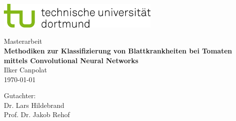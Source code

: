 \begin{titlepage}
\vspace*{-2cm}
\newlength{\links}
\setlength{\links}{-1.5cm}
\sffamily
\hspace*{\links}
\begin{minipage}{12.5cm}
\includegraphics[width=8cm]{bilder/tud_logo_rgb}
\end{minipage}

\vspace*{4cm}

\hspace*{\links}
\hspace*{-0.2cm}
\begin{minipage}{9cm}
\large
\begin{center}
{\Large Masterarbeit} \\
\vspace*{1cm}
\textbf{Methodiken zur Klassifizierung von Blattkrankheiten bei Tomaten mittels Convolutional Neural Networks} \\
\vspace*{1cm}
Ilker Canpolat\\
\today
\end{center}
\end{minipage}
\normalsize
\vspace*{5.5cm}


\vspace*{2.1cm}

\hspace*{\links}
\begin{minipage}[b]{5cm}
\raggedright
Gutachter: \\
Dr. Lars Hildebrand \\
Prof. Dr. Jakob Rehof \\
\end{minipage}


\end{titlepage}
